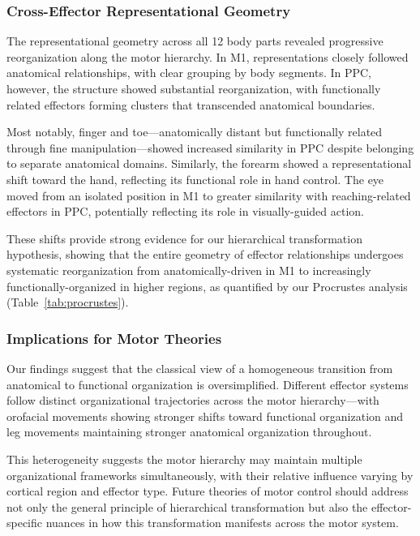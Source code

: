 \documentclass{article}
\begin{document}
\subsubsection{Cross-Effector Representational Geometry}

The representational geometry across all 12 body parts revealed progressive reorganization along the motor hierarchy. In M1, representations closely followed anatomical relationships, with clear grouping by body segments. In PPC, however, the structure showed substantial reorganization, with functionally related effectors forming clusters that transcended anatomical boundaries.

Most notably, finger and toe—anatomically distant but functionally related through fine manipulation—showed increased similarity in PPC despite belonging to separate anatomical domains. Similarly, the forearm showed a representational shift toward the hand, reflecting its functional role in hand control. The eye moved from an isolated position in M1 to greater similarity with reaching-related effectors in PPC, potentially reflecting its role in visually-guided action.

These shifts provide strong evidence for our hierarchical transformation hypothesis, showing that the entire geometry of effector relationships undergoes systematic reorganization from anatomically-driven in M1 to increasingly functionally-organized in higher regions, as quantified by our Procrustes analysis (Table~\ref{tab:procrustes}).

\subsubsection{Implications for Motor Theories}

Our findings suggest that the classical view of a homogeneous transition from anatomical to functional organization is oversimplified. Different effector systems follow distinct organizational trajectories across the motor hierarchy—with orofacial movements showing stronger shifts toward functional organization and leg movements maintaining stronger anatomical organization throughout.

This heterogeneity suggests the motor hierarchy may maintain multiple organizational frameworks simultaneously, with their relative influence varying by cortical region and effector type. Future theories of motor control should address not only the general principle of hierarchical transformation but also the effector-specific nuances in how this transformation manifests across the motor system.
\end{document}
